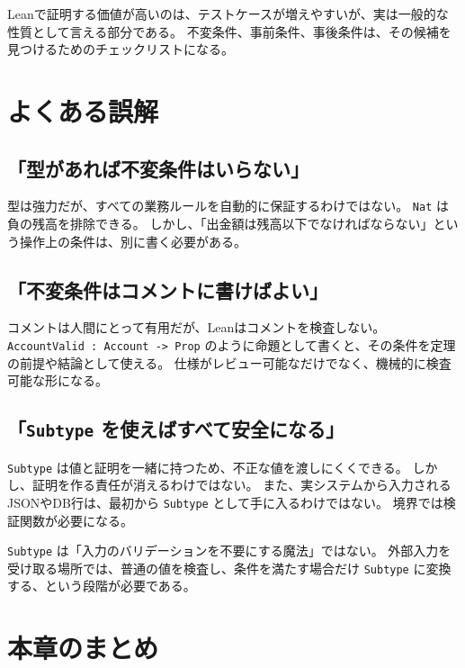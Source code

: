 \begin{softwarebox}
Leanで証明する価値が高いのは、テストケースが増えやすいが、実は一般的な性質として言える部分である。
不変条件、事前条件、事後条件は、その候補を見つけるためのチェックリストになる。
\end{softwarebox}

\section{よくある誤解}

\subsection{「型があれば不変条件はいらない」}

型は強力だが、すべての業務ルールを自動的に保証するわけではない。
\texttt{Nat} は負の残高を排除できる。
しかし、「出金額は残高以下でなければならない」という操作上の条件は、別に書く必要がある。

\subsection{「不変条件はコメントに書けばよい」}

コメントは人間にとって有用だが、Leanはコメントを検査しない。
\texttt{AccountValid : Account -> Prop} のように命題として書くと、その条件を定理の前提や結論として使える。
仕様がレビュー可能なだけでなく、機械的に検査可能な形になる。

\subsection{「\texttt{Subtype} を使えばすべて安全になる」}

\texttt{Subtype} は値と証明を一緒に持つため、不正な値を渡しにくくできる。
しかし、証明を作る責任が消えるわけではない。
また、実システムから入力されるJSONやDB行は、最初から \texttt{Subtype} として手に入るわけではない。
境界では検証関数が必要になる。

\begin{warningbox}
\texttt{Subtype} は「入力のバリデーションを不要にする魔法」ではない。
外部入力を受け取る場所では、普通の値を検査し、条件を満たす場合だけ \texttt{Subtype} に変換する、という段階が必要である。
\end{warningbox}

\section{本章のまとめ}

